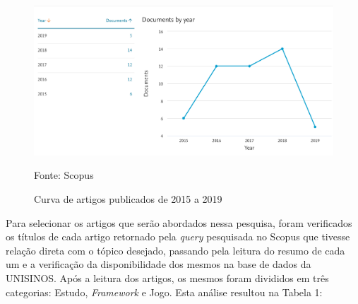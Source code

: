 \documentclass[twoside,english,brazilian]{UNISINOSartigo}
\begin{document}

\begin{figure}[!htbp]
	\caption{Curva de artigos publicados de 2015 a 2019}
	\label{fig:imagens/pubByYear.png}
	\centering%
		\includegraphics[width=\textwidth]{imagens/pubByYear.png}
	\begin{center}
        Fonte: Scopus
    \end{center}
\end{figure}

Para selecionar os artigos que ser\~{a}o abordados nessa pesquisa, foram verificados os t\'{i}tulos de cada artigo retornado pela \textit{query} pesquisada no Scopus que tivesse rela\c{c}\~{a}o direta com o t\'{o}pico desejado, passando pela leitura do resumo de cada um e a verifica\c{c}\~{a}o da disponibilidade dos mesmos na base de dados da UNISINOS. Após a leitura dos artigos, os mesmos foram divididos em três categorias: Estudo, \textit{Framework} e Jogo. Esta an\'{a}lise resultou na Tabela 1:

\newpage
\end{document}
